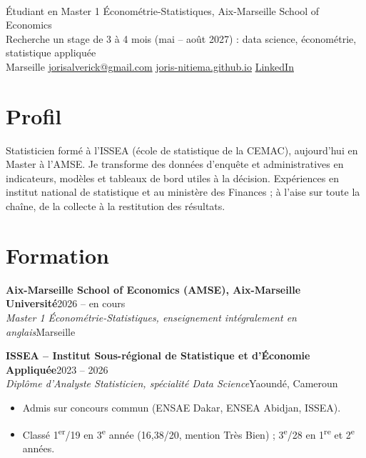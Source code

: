 \documentclass[10pt,a4paper]{article}
\newcommand{\entry}[4]{\textbf{#1}\hfill{\small\color{muted}#2}\\{\itshape #3}\hfill{\small\color{muted}#4}\par}
\newcommand{\lnk}[2]{\href{#1}{\color{olive}#2}}
\begin{document}
{\\[3pt]
{\sffamily \'Etudiant en Master 1 \'Econom\'etrie-Statistiques, Aix-Marseille School of Economics}\\[2pt]
{\sffamily\small\color{olive} Recherche un stage de 3 \`a 4 mois (mai -- ao\^ut 2027) : data science, \'econom\'etrie, statistique appliqu\'ee}\\[3pt]
{\small Marseille \;\textbar\; \lnk{mailto:jorisalverick@gmail.com}{jorisalverick@gmail.com} \;\textbar\; \lnk{https://joris-nitiema.github.io/fr/}{joris-nitiema.github.io} \;\textbar\; \lnk{https://www.linkedin.com/in/joris-alverick-nitiema-67b8a4333/}{LinkedIn}}\par}

\section{Profil}
Statisticien form\'e \`a l'ISSEA (\'ecole de statistique de la CEMAC), aujourd'hui en Master \`a l'AMSE. Je transforme des donn\'ees d'enqu\^ete et administratives en indicateurs, mod\`eles et tableaux de bord utiles \`a la d\'ecision. Exp\'eriences en institut national de statistique et au minist\`ere des Finances ; \`a l'aise sur toute la cha\^ine, de la collecte \`a la restitution des r\'esultats.

\section{Formation}
\entry{Aix-Marseille School of Economics (AMSE), Aix-Marseille Universit\'e}{2026 -- en cours}{Master 1 \'Econom\'etrie-Statistiques, enseignement int\'egralement en anglais}{Marseille}
\vspace{3pt}
\entry{ISSEA -- Institut Sous-r\'egional de Statistique et d'\'Economie Appliqu\'ee}{2023 -- 2026}{Dipl\^ome d'Analyste Statisticien, sp\'ecialit\'e Data Science}{Yaound\'e, Cameroun}
\begin{itemize}
\item Admis sur concours commun (ENSAE Dakar, ENSEA Abidjan, ISSEA).
\item Class\'e 1\textsuperscript{er}/19 en 3\textsuperscript{e} ann\'ee (16,38/20, mention Tr\`es Bien) ; 3\textsuperscript{e}/28 en 1\textsuperscript{re} et 2\textsuperscript{e} ann\'ees.
\end{itemize}
\end{document}
